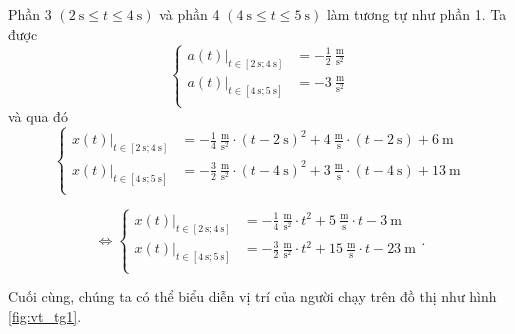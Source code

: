 \documentclass[a4paper, titlepage, openany]{book}
\begin{document}
Phần 3 $\left(2\ \text{s}\leq t \leq 4\ \text{s}\right)$ và phần 4 $\left(4\ \text{s}\leq t \leq 5\ \text{s}\right)$ làm tương tự như phần 1. Ta được
\begin{equation*}
   \begin{cases}
     \left.a(t)\right|_{t\in\left[2\ \text{s};4\ \text{s}\right]} &= -\frac{1}{2}\ \frac{\text{m}}{\text{s}^2}\\
     \left.a(t)\right|_{t\in\left[4\ \text{s};5\ \text{s}\right]} &= -3\ \frac{\text{m}}{\text{s}^2}\\
   \end{cases}
\end{equation*}
và qua đó
\begin{equation*}
   \begin{cases}
     \left.x(t)\right|_{t\in\left[2\ \text{s};4\ \text{s}\right]} &= -\frac{1}{4}\ \frac{\text{m}}{\text{s}^2}\cdot\left(t - 2\ \text{s}\right)^2 + 4\ \frac{\text{m}}{\text{s}}\cdot \left(t - 2\ \text{s}\right) + 6\ \text{m}\\
     \left.x(t)\right|_{t\in\left[4\ \text{s};5\ \text{s}\right]} &= -\frac{3}{2}\ \frac{\text{m}}{\text{s}^2}\cdot\left(t - 4\ \text{s}\right)^2 + 3\ \frac{\text{m}}{\text{s}}\cdot \left(t - 4\ \text{s}\right) + 13\ \text{m}\\
   \end{cases}
\end{equation*}

\begin{equation*}
         \iff
   \begin{cases}
     \left.x(t)\right|_{t\in\left[2\ \text{s};4\ \text{s}\right]} &= -\frac{1}{4}\ \frac{\text{m}}{\text{s}^2}\cdot t^2 + 5\ \frac{\text{m}}{\text{s}}\cdot t - 3\ \text{m}\\
     \left.x(t)\right|_{t\in\left[4\ \text{s};5\ \text{s}\right]} &= -\frac{3}{2}\ \frac{\text{m}}{\text{s}^2}\cdot t^2 + 15\ \frac{\text{m}}{\text{s}}\cdot t - 23\ \text{m}\\
   \end{cases}.
\end{equation*}

Cuối cùng, chúng ta có thể biểu diễn vị trí của người chạy trên đồ thị như hình \ref{fig:vt_tg1}.
\end{document}
